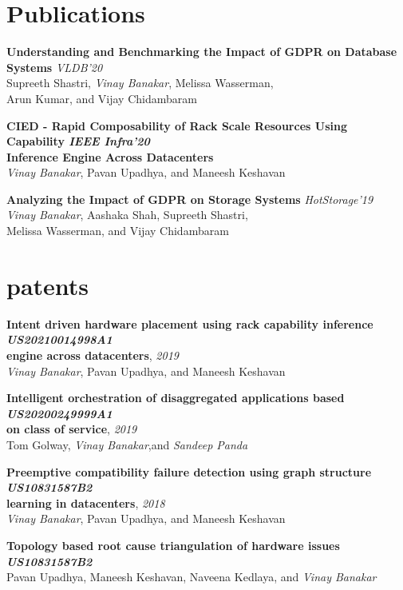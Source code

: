 \documentclass[a4paper,10pt]{article}
\begin{document}
\section{Publications}
\begin{enumerate}[ {[}1{]} ]
\item \textbf{Understanding and Benchmarking the Impact of GDPR on Database Systems} \hspace*{\fill} \emph{VLDB'20} \\
Supreeth Shastri, \emph{Vinay Banakar}, Melissa Wasserman,\\ Arun Kumar, and Vijay Chidambaram
\item \textbf{CIED - Rapid Composability of Rack Scale Resources Using Capability \hspace*{\fill} \textnormal{\emph{IEEE Infra'20}}\\ Inference Engine Across Datacenters} \\
\emph{Vinay Banakar}, Pavan Upadhya, and Maneesh Keshavan
\item \textbf{Analyzing the Impact of GDPR on Storage Systems} \hspace*{\fill} \emph{HotStorage'19}\\
\emph{Vinay Banakar}, Aashaka Shah, Supreeth Shastri,\\ Melissa Wasserman, and Vijay Chidambaram
\end{enumerate}

\section{patents}
\begin{enumerate}[ {[}1{]} ]
\item \textbf{Intent driven hardware placement using rack capability inference \hspace*{\fill} \textnormal{\emph{US20210014998A1}} \\ engine across datacenters}, \emph{2019}\\
\emph{Vinay Banakar}, Pavan Upadhya, and Maneesh Keshavan
\item \textbf{Intelligent orchestration of disaggregated applications based \hspace*{\fill} \textnormal{\emph{US20200249999A1}}\\  on class of service}, \emph{2019}\\
Tom Golway, \emph{Vinay Banakar},and \emph{Sandeep Panda}
\item \textbf{Preemptive compatibility failure detection using graph structure \hspace*{\fill} \textnormal{\emph{US10831587B2}}\\ learning in datacenters}, \emph{2018}\\
\emph{Vinay Banakar}, Pavan Upadhya, and Maneesh Keshavan
\item \textbf{Topology based root cause triangulation of hardware issues \hspace*{\fill} \textnormal{\emph{US10831587B2}}} \\
Pavan Upadhya, Maneesh Keshavan, Naveena Kedlaya, and \emph{Vinay Banakar} \\
\end{enumerate}
\end{document}
